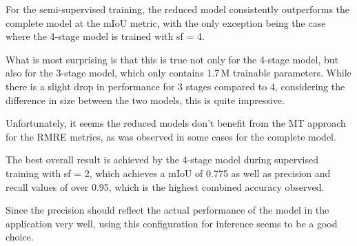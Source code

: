 For the semi-supervised training, the reduced model consistently outperforms the complete model at the mIoU metric, with the only exception being the case where the 4-stage model is trained with sf = 4. 

What is most surprising is that this is true not only for the 4-stage model, but also for the 3-stage model, which only contains 1.7\,M trainable parameters.
While there is a slight drop in performance for 3 stages compared to 4, considering the difference in size between the two models, this is quite impressive.

Unfortunately, it seems the reduced models don't benefit from the MT approach for the RMRE metrics, as was observed in some cases for the complete model.

The best overall result is achieved by the 4-stage model during supervised training with sf = 2, which achieves a mIoU of 0.775 as well as precision and recall values of over 0.95, which is the highest combined accuracy observed.

Since the precision should reflect the actual performance of the model in the application very well, using this configuration for inference seems to be a good choice.


